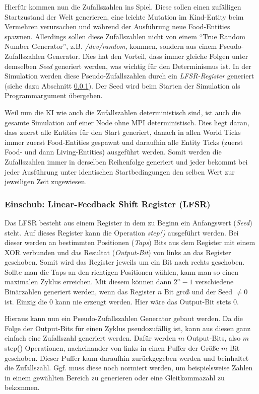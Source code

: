 \documentclass[course=erap]{aspdoc}
\begin{document}
Hierfür kommen nun die Zufallszahlen ins Spiel. Diese sollen einen zufälligen Startzustand der Welt generieren, eine leichte Mutation im Kind-Entity beim Vermehren verursachen und während der Ausführung neue Food-Entities spawnen. Allerdings sollen diese Zufallszahlen nicht von einem "`True Random Number Generator"', z.B. \emph{/dev/random}, kommen, sondern aus einem Pseudo-Zufallszahlen Generator. Dies hat den Vorteil, dass immer gleiche Folgen unter demselben \emph{Seed} generiert werden, was wichtig für den Determinismus ist. In der Simulation werden diese Pseudo-Zufallszahlen durch ein \emph{LFSR-Register} generiert (siehe dazu Abschnitt \ref{subsubsec:lfsr-register}). Der Seed wird beim Starten der Simulation als Programmargument übergeben.

Weil nun die KI wie auch die Zufallszahlen deterministisch sind, ist auch die gesamte Simulation auf einer Node ohne MPI deterministisch. Dies liegt daran, dass zuerst alle Entities für den Start generiert, danach in allen World Ticks immer zuerst Food-Entities gespawnt und daraufhin alle Entity Ticks (zuerst Food- und dann Living-Entities) ausgeführt werden. Somit werden die Zufallszahlen immer in derselben Reihenfolge generiert und jeder bekommt bei jeder Ausführung unter identischen Startbedingungen den selben Wert zur jeweiligen Zeit zugewiesen.


\subsubsection{Einschub: Linear-Feedback Shift Register (LFSR)}
\label{subsubsec:lfsr-register}
Das LFSR besteht aus einem Register in dem zu Beginn ein Anfangswert (\emph{Seed}) steht. Auf dieses Register kann die Operation \emph{step()} ausgeführt werden. Bei dieser werden an bestimmten Positionen (\emph{Taps}) Bits aus dem Register mit einem XOR verbunden und das Resultat (\emph{Output-Bit}) von links an das Register geschoben. Somit wird das Register jeweils um ein Bit nach rechts geschoben. Sollte man die Taps an den richtigen Positionen wählen, kann man so einen maximalen Zyklus erreichen. Mit diesem können dann \(2^n - 1\) verschiedene Binärzahlen generiert werden, wenn das Register \(n\) Bit groß und der Seed \(\neq 0\) ist. Einzig die 0 kann nie erzeugt werden. Hier wäre das Output-Bit stets 0.

Hieraus kann nun ein Pseudo-Zufallszahlen Generator gebaut werden. Da die Folge der Output-Bits für einen Zyklus pseudozufällig ist, kann aus diesen ganz einfach eine Zufallszahl generiert werden. Dafür werden \(m\) Output-Bits, also \(m\) step() Operationen, nacheinander von links in einen Puffer der Größe \(m\) Bit geschoben. Dieser Puffer kann daraufhin zurückgegeben werden und beinhaltet die Zufallszahl. Ggf. muss diese noch normiert werden, um beispielsweise Zahlen in einem gewählten Bereich zu generieren oder eine Gleitkommazahl zu bekommen.
\end{document}
